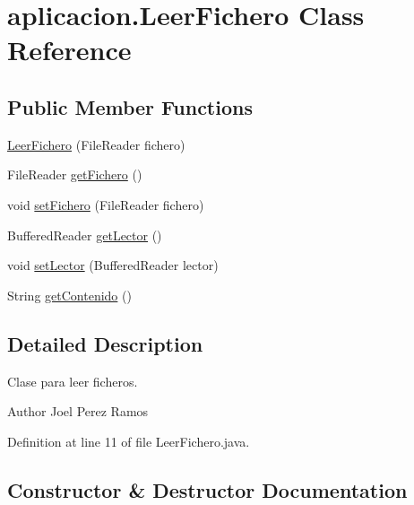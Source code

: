 \hypertarget{classaplicacion_1_1_leer_fichero}{}\section{aplicacion.\+Leer\+Fichero Class Reference}
\label{classaplicacion_1_1_leer_fichero}
\subsection*{Public Member Functions}
\begin{DoxyCompactItemize}
\item 
\hyperlink{classaplicacion_1_1_leer_fichero_a6ecbade55a18cd4e748dfd664d7ede6b}{Leer\+Fichero} (File\+Reader fichero)
\item 
File\+Reader \hyperlink{classaplicacion_1_1_leer_fichero_ac85026646b27dee1b9dd2d28eaa4ae59}{get\+Fichero} ()
\item 
void \hyperlink{classaplicacion_1_1_leer_fichero_a8472b4b43bd6e2d3bc65a45e1f935b18}{set\+Fichero} (File\+Reader fichero)
\item 
Buffered\+Reader \hyperlink{classaplicacion_1_1_leer_fichero_ae9b6c34feb9e518c222eb23937a81716}{get\+Lector} ()
\item 
void \hyperlink{classaplicacion_1_1_leer_fichero_aa4bde84f5a2616e197367dcb1d14bc77}{set\+Lector} (Buffered\+Reader lector)
\item 
String \hyperlink{classaplicacion_1_1_leer_fichero_a1bbd72cd2d98a81cc7ebabae57465e7f}{get\+Contenido} ()
\end{DoxyCompactItemize}


\subsection{Detailed Description}
Clase para leer ficheros. \begin{DoxyAuthor}{Author}
Joel Perez Ramos 
\end{DoxyAuthor}


Definition at line 11 of file Leer\+Fichero.\+java.



\subsection{Constructor \& Destructor Documentation}
\hypertarget{classaplicacion_1_1_leer_fichero_a6ecbade55a18cd4e748dfd664d7ede6b}{}\label{classaplicacion_1_1_leer_fichero_a6ecbade55a18cd4e748dfd664d7ede6b} 
